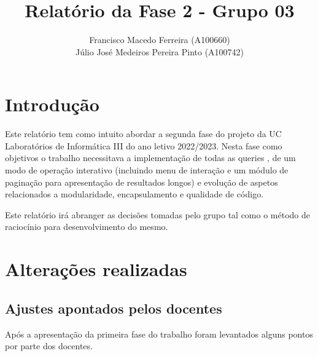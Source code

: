 \documentclass{article}
\title{Relatório da Fase 2 - Grupo 03}
\author{Francisco Macedo Ferreira (A100660)\\Júlio José Medeiros Pereira Pinto (A100742)}
\begin{document}
  
    \maketitle

    \pagebreak
    \setcounter{tocdepth}{2}
    \tableofcontents
    
    \pagebreak
    
    \section{Introdução}
    Este relatório tem como intuito abordar a segunda fase do projeto da UC Laboratórios 
    de Informática III do ano letivo 2022/2023.
    Nesta fase como objetivos o trabalho necessitava a implementação de todas as queries
    , de um modo de operação interativo (incluindo menu de interação e um módulo de 
    paginação para apresentação de resultados longos) e evolução de aspetos relacionados
    a modularidade, encapsulamento e qualidade de código.
    
    Este relatório irá abranger as decisões tomadas pelo grupo tal como o método de 
    raciocínio para desenvolvimento do mesmo.
    
    \section{Alterações realizadas}
        \subsection{Ajustes apontados pelos docentes}
            Após a apresentação da primeira fase do trabalho foram levantados
            alguns pontos por parte dos docentes. 
\end{document}

